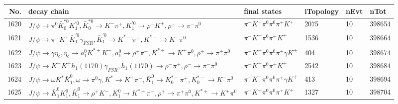 \begin{table}[htbp] 
\begin{center}
\begin{small}
\begin{tabular}{rlllll}\hline\hline
 No. & decay chain & final states &  iTopology & nEvt & nTot \\\hline
1620&$J/\psi       \rightarrow \pi^{0}        \bar{K}_0^{*0}K_1^{'0}      , \bar{K}_0^{*0} \rightarrow K^{-}          \pi^{+}        , K_1^{'0}       \rightarrow \rho^{-}      K^{+}          , \rho^{-}       \rightarrow \pi^{-}        \pi^{0}        $&$\pi^{-}        K^{-}          \pi^{0}        \pi^{0}        \pi^{+}        K^{+}          $& 2075&   10&398654\\
1621&$J/\psi       \rightarrow \pi^{-}        K^{+}          \bar{K}_1^{'0}\gamma_{FSR} , \bar{K}_1^{'0} \rightarrow K^{*-}         \pi^{+}        , K^{*-}          \rightarrow K^{-}          \pi^{0}        $&$\pi^{-}        K^{-}          \pi^{0}        \pi^{+}        K^{+}          $& 1536&   10&398664\\
1622&$J/\psi       \rightarrow \gamma       \eta_{c}    , \eta_{c}     \rightarrow a_{1}^{0}      K^{*+}         K^{-}          , a_{1}^{0}       \rightarrow \rho^{+}      \pi^{-}        , K^{*+}          \rightarrow K^{+}          \pi^{0}        , \rho^{+}       \rightarrow \pi^{+}        \pi^{0}        $&$\pi^{-}        K^{-}          \pi^{0}        \pi^{0}        \pi^{+}        \gamma       K^{+}          $&  404&   10&398674\\
1623&$J/\psi       \rightarrow K^{-}          K^{+}          h_{1}(1170)    \gamma_{FSR} , h_{1}(1170)     \rightarrow \rho^{-}      \pi^{+}        , \rho^{-}       \rightarrow \pi^{-}        \pi^{0}        $&$\pi^{-}        K^{-}          \pi^{0}        \pi^{+}        K^{+}          $& 2542&   10&398684\\
1624&$J/\psi       \rightarrow \omega         K^{*}          \bar{K}_1^{0} , \omega          \rightarrow \pi^{0}        \gamma       , K^{*}           \rightarrow K^{+}          \pi^{-}        , \bar{K}_1^{0}  \rightarrow K_{0}^{*-}     \pi^{+}        , K_{0}^{*-}      \rightarrow K^{-}          \pi^{0}        $&$\pi^{-}        K^{-}          \pi^{0}        \pi^{0}        \pi^{+}        \gamma       K^{+}          $&  413&   10&398694\\
1625&$J/\psi       \rightarrow \bar{K}_1^{0} K_1^{0}        , \bar{K}_1^{0}  \rightarrow \rho^{+}      K^{-}          , K_1^{0}         \rightarrow K^{*+}         \pi^{-}        , \rho^{+}       \rightarrow \pi^{+}        \pi^{0}        , K^{*+}          \rightarrow K^{+}          \pi^{0}        $&$\pi^{-}        K^{-}          \pi^{0}        \pi^{0}        \pi^{+}        K^{+}          $& 1327&   10&398704\\

\end{tabular}
\end{small}
\end{center}
\end{table}
